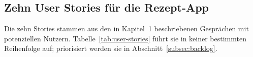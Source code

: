 %
\subsection{Zehn User Stories für die Rezept-App}
\label{subsec:stories}

Die zehn Stories stammen aus den in Kapitel~1 beschriebenen Gesprächen mit potenziellen Nutzern. Tabelle~\ref{tab:user-stories} führt sie in keiner bestimmten Reihenfolge auf; priorisiert werden sie in Abschnitt~\ref{subsec:backlog}.

